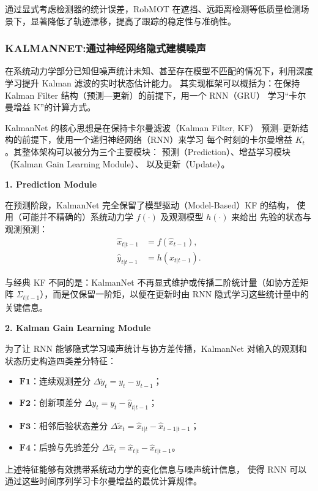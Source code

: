\documentclass{article}
\begin{document}
通过显式考虑检测器的统计误差，RobMOT 在遮挡、远距离检测等低质量检测场景下，显著降低了轨迹漂移，提高了跟踪的稳定性与准确性。

\subsubsection*{KALMANNET:通过神经网络隐式建模噪声}

在系统动力学部分已知但噪声统计未知、甚至存在模型不匹配的情况下，利用深度学习提升 Kalman 滤波的实时状态估计能力。
其实现框架可以概括为：在保持 Kalman Filter 结构（预测—更新）的前提下，用一个 RNN（GRU） 学习“卡尔曼增益 K”的计算方式。

KalmanNet 的核心思想是在保持卡尔曼滤波（Kalman Filter, KF）
预测–更新结构的前提下，使用一个递归神经网络（RNN）来学习
每个时刻的卡尔曼增益 $K_t$。其整体架构可以被分为三个主要模块：
预测（Prediction）、增益学习模块（Kalman Gain Learning Module）、
以及更新（Update）。

\textbf{1. Prediction Module}

在预测阶段，KalmanNet 完全保留了模型驱动（Model-Based）KF 的结构，
使用（可能并不精确的）系统动力学 $f(\cdot)$ 及观测模型 $h(\cdot)$ 来给出
先验的状态与观测预测：
\begin{align}
    \hat{x}_{t|t-1} &= f(\hat{x}_{t-1}), \\
    \hat{y}_{t|t-1} &= h(\hat{x}_{t|t-1}).
\end{align}

与经典 KF 不同的是：KalmanNet 不再显式维护或传播二阶统计量（如协方差矩阵
$\Sigma_{t|t-1}$），而是仅保留一阶矩，以便在更新时由 RNN 隐式学习这些统计量中的关键信息。

\textbf{2. Kalman Gain Learning Module}

为了让 RNN 能够隐式学习噪声统计与协方差传播，KalmanNet 对输入的观测和状态历史构造四类差分特征：
\begin{itemize}[leftmargin=10em,itemsep=2pt,parsep=0pt]
    \item $\mathbf{F1}$：连续观测差分 $\Delta \tilde{y}_t = y_t - y_{t-1}$；
    \item $\mathbf{F2}$：创新项差分 $\Delta y_t = y_t - \hat{y}_{t|t-1}$；
    \item $\mathbf{F3}$：相邻后验状态差分 $\Delta \tilde{x}_t = \hat{x}_{t|t} - \hat{x}_{t-1|t-1}$；
    \item $\mathbf{F4}$：后验与先验差分 $\Delta \hat{x}_t = \hat{x}_{t|t} - \hat{x}_{t|t-1}$。
\end{itemize}

上述特征能够有效携带系统动力学的变化信息与噪声统计信息，
使得 RNN 可以通过这些时间序列学习卡尔曼增益的最优计算规律。
\end{document}

